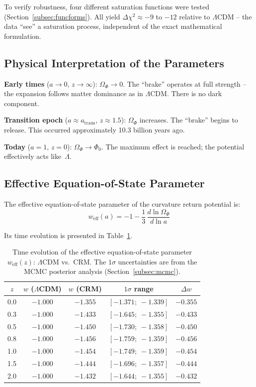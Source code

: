 \documentclass[aps,prd,twocolumn,superscriptaddress,nofootinbib]{revtex4-2}
\begin{document}
To verify robustness, four different saturation functions were tested (Section~\ref{subsec:funcforms}). All yield $\Delta\chi^2 \approx -9$ to $-12$ relative to $\Lambda$CDM -- the data ``see'' a saturation process, independent of the exact mathematical formulation.

\subsection{Physical Interpretation of the Parameters}
\label{subsec:interpretation}

\textbf{Early times} ($a \to 0$, $z \to \infty$): $\Omega_\Phi \to 0$. The ``brake'' operates at full strength -- the expansion follows matter dominance as in $\Lambda$CDM. There is no dark component.

\textbf{Transition epoch} ($a \approx a_{\mathrm{trans}}$, $z \approx 1.5$): $\Omega_\Phi$ increases. The ``brake'' begins to release. This occurred approximately 10.3 billion years ago.

\textbf{Today} ($a = 1$, $z = 0$): $\Omega_\Phi \to \Phi_0$. The maximum effect is reached; the potential effectively acts like~$\Lambda$.


\subsection{Effective Equation-of-State Parameter}
\label{subsec:weff}

The effective equation-of-state parameter of the curvature return potential is:
\begin{equation}
w_{\mathrm{eff}}(a) = -1 - \frac{1}{3}\,\frac{d\ln\Omega_\Phi}{d\ln a}
\label{eq:weff}
\end{equation}

Its time evolution is presented in Table~\ref{tab:weff}.

\begin{table}[htbp]
\centering
\caption{Time evolution of the effective equation-of-state parameter $w_{\mathrm{eff}}(z)$: $\Lambda$CDM vs.\ CRM. The $1\sigma$ uncertainties are from the MCMC posterior analysis (Section~\ref{subsec:mcmc}).}
\label{tab:weff}
\begin{tabular}{ccccc}
\toprule
$z$ & $w$ ($\Lambda$CDM) & $w$ (CRM) & $1\sigma$ range & $\Delta w$ \\
\midrule
0.0 & $-1.000$ & $-1.355$ & $[-1.371;\;-1.339]$ & $\mathbf{-0.355}$ \\
0.3 & $-1.000$ & $-1.433$ & $[-1.645;\;-1.355]$ & $\mathbf{-0.433}$ \\
0.5 & $-1.000$ & $-1.450$ & $[-1.730;\;-1.358]$ & $\mathbf{-0.450}$ \\
0.8 & $-1.000$ & $-1.456$ & $[-1.759;\;-1.359]$ & $\mathbf{-0.456}$ \\
1.0 & $-1.000$ & $-1.454$ & $[-1.749;\;-1.359]$ & $\mathbf{-0.454}$ \\
1.5 & $-1.000$ & $-1.444$ & $[-1.696;\;-1.357]$ & $\mathbf{-0.444}$ \\
2.0 & $-1.000$ & $-1.432$ & $[-1.644;\;-1.355]$ & $\mathbf{-0.432}$ \\
\bottomrule
\end{tabular}
\end{table}
\end{document}
